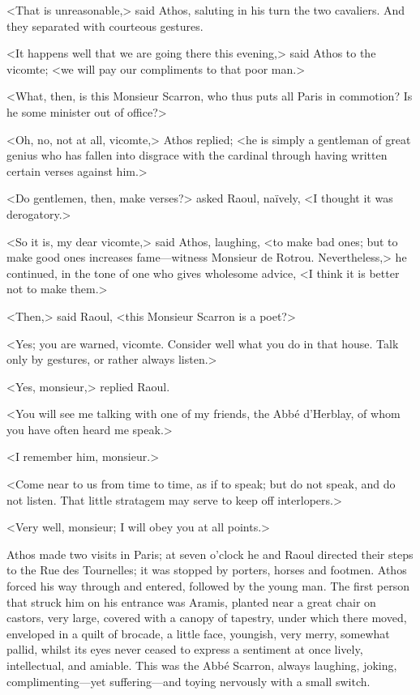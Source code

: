 <That is unreasonable,> said Athos, saluting in his turn the two cavaliers. And they separated with courteous gestures.

<It happens well that we are going there this evening,> said Athos to the vicomte; <we will pay our compliments to that poor man.>

<What, then, is this Monsieur Scarron, who thus puts all Paris in commotion? Is he some minister out of office?>

<Oh, no, not at all, vicomte,> Athos replied; <he is simply a gentleman of great genius who has fallen into disgrace with the cardinal through having written certain verses against him.>

<Do gentlemen, then, make verses?> asked Raoul, naïvely, <I thought it was derogatory.>

<So it is, my dear vicomte,> said Athos, laughing, <to make bad ones; but to make good ones increases fame—witness Monsieur de Rotrou. Nevertheless,> he continued, in the tone of one who gives wholesome advice, <I think it is better not to make them.>

<Then,> said Raoul, <this Monsieur Scarron is a poet?>

<Yes; you are warned, vicomte. Consider well what you do in that house. Talk only by gestures, or rather always listen.>

<Yes, monsieur,> replied Raoul.

<You will see me talking with one of my friends, the Abbé d'Herblay, of whom you have often heard me speak.>

<I remember him, monsieur.>

<Come near to us from time to time, as if to speak; but do not speak, and do not listen. That little stratagem may serve to keep off interlopers.>

<Very well, monsieur; I will obey you at all points.>

Athos made two visits in Paris; at seven o'clock he and Raoul directed their steps to the Rue des Tournelles; it was stopped by porters, horses and footmen. Athos forced his way through and entered, followed by the young man. The first person that struck him on his entrance was Aramis, planted near a great chair on castors, very large, covered with a canopy of tapestry, under which there moved, enveloped in a quilt of brocade, a little face, youngish, very merry, somewhat pallid, whilst its eyes never ceased to express a sentiment at once lively, intellectual, and amiable. This was the Abbé Scarron, always laughing, joking, complimenting—yet suffering—and toying nervously with a small switch.

